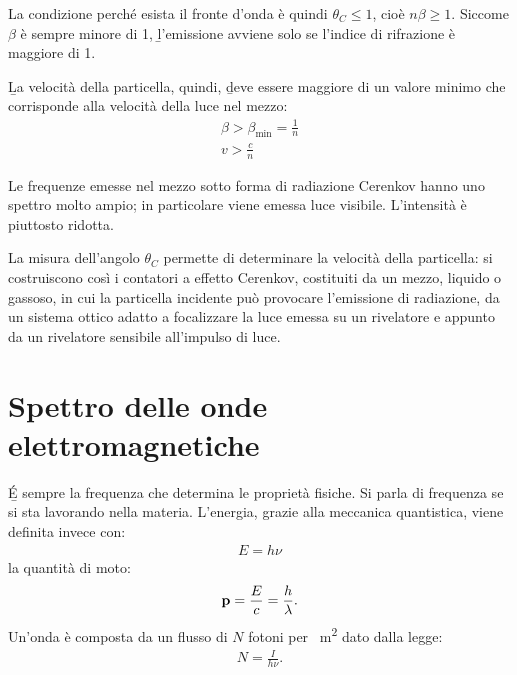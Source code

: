 La condizione perché esista il fronte d'onda è quindi $\theta_C\le1$, cioè $n\beta\ge1$. Siccome $\beta$ è sempre minore di 1, \b{l'emissione avviene solo se l'indice di rifrazione è maggiore di 1}.

\b{La velocità della particella}, quindi, \b{deve essere maggiore di un valore minimo che corrisponde alla velocità della luce nel mezzo}:
\begin{equation}\begin{split}
\beta>\beta_{\min}=\frac{1}{n}\\
v>\frac{c}{n}
\end{split}\end{equation}

Le frequenze emesse nel mezzo sotto forma di radiazione Cerenkov hanno uno spettro molto ampio; in particolare viene emessa luce visibile. L'intensità è piuttosto ridotta.

La misura dell'angolo $\theta_C$ permette di determinare la velocità della particella: si costruiscono così i contatori a effetto Cerenkov, costituiti da un mezzo, liquido o gassoso, in cui la particella incidente può provocare l'emissione di radiazione, da un sistema ottico adatto a focalizzare la luce emessa su un rivelatore e appunto da un rivelatore sensibile all'impulso di luce.

\section{Spettro delle onde elettromagnetiche}%
\b{\'E sempre la frequenza che determina le proprietà fisiche}. Si parla di frequenza se si sta lavorando nella materia. L'energia, grazie alla meccanica quantistica, viene definita invece con:
\begin{equation}\begin{split}
E=h\nu
\end{split}\end{equation}
la quantità di moto:
\begin{equation}\begin{split}
\mathbf{p}=\frac{E}{c}=\frac{h}{\lambda}.
\end{split}\end{equation}
Un'onda è composta da un flusso di $N$ fotoni per \SI{}{m^2} dato dalla legge:
\begin{equation}\begin{split}
N=\frac{I}{h\nu}.
\end{split}\end{equation}

